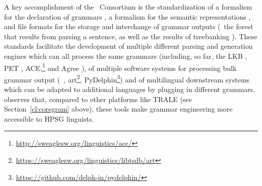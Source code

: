 \documentclass[output=paper,nonflat]{langsci/langscibook}
\begin{document}
A key accomplishment of the \delphin\ Consortium is the standardization
of a formalism for the declaration of grammars
\citep{Copestake:02:CLE}, a formalism for the semantic representations
\citep{CFPS2005a}, and file formats for the storage and interchange of
grammar outputs (\eg\ the forest that results from parsing a sentence,
as well as the results of treebanking \citep{Oepen:01,OFTM2004a-u}).
These standards facilitate the development of multiple different
parsing and generation engines which can all process the same grammars
(including, so far, the LKB \citep{Copestake2002a}, PET
\citep{callmeier00},
ACE,\footnote{\url{http://sweaglesw.org/linguistics/ace/}} and Agree
\citep{Slayden2012a-u}), of multiple software systems for processing
bulk grammar output (\itsdb\ \citep{Oepen:01}, art\footnote{%
\url{https://sweaglesw.org/linguistics/libtsdb/art}}, PyDelphin\footnote{%
	\url{https://github.com/delph-in/pydelphin/}
})
and of multilingual downstream systems which can be adapted to additional
languages by plugging in different grammars.
\citet{MelnikHandWritten} observes that,
compared to other platforms like TRALE (see Section~\ref{cl:coregram} above),
these tools make grammar engineering more accessible to HPSG linguists.
\end{document}
